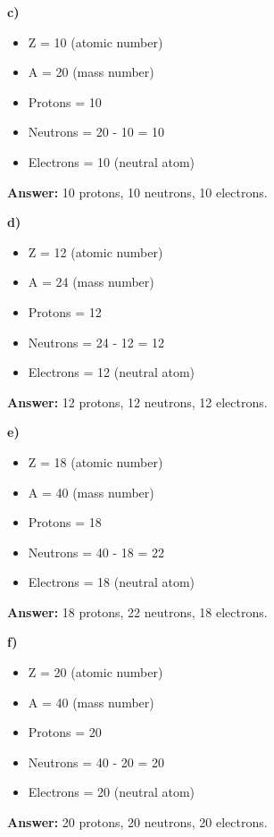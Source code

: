 \begin{exercise}
\begin{solu}
        \textbf{c) }
        \begin{itemize}
            \item Z = 10 (atomic number)
            \item A = 20 (mass number)
            \item Protons = 10
            \item Neutrons = 20 - 10 = 10
            \item Electrons = 10 (neutral atom)
        \end{itemize}
        \textbf{Answer:} 10 protons, 10 neutrons, 10 electrons.

        \textbf{d) }
        \begin{itemize}
            \item Z = 12 (atomic number)
            \item A = 24 (mass number)
            \item Protons = 12
            \item Neutrons = 24 - 12 = 12
            \item Electrons = 12 (neutral atom)
        \end{itemize}
        \textbf{Answer:} 12 protons, 12 neutrons, 12 electrons.

        \textbf{e) }
        \begin{itemize}
            \item Z = 18 (atomic number)
            \item A = 40 (mass number)
            \item Protons = 18
            \item Neutrons = 40 - 18 = 22
            \item Electrons = 18 (neutral atom)
        \end{itemize}
        \textbf{Answer:} 18 protons, 22 neutrons, 18 electrons.

        \textbf{f) }
        \begin{itemize}
            \item Z = 20 (atomic number)
            \item A = 40 (mass number)
            \item Protons = 20
            \item Neutrons = 40 - 20 = 20
            \item Electrons = 20 (neutral atom)
        \end{itemize}
        \textbf{Answer:} 20 protons, 20 neutrons, 20 electrons.
    \end{solu}
\end{exercise}
